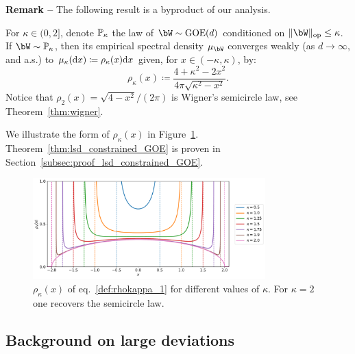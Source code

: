 \myskip
\textbf{Remark --}
The following result is a byproduct of our analysis.
\begin{theorem}\label{thm:lsd_constrained_GOE}
   For $\kappa \in (0,2]$, denote $\mathbb{P}_\kappa$ the law of $\bW \sim \GOE(d)$ conditioned on $\|\bW\|_\op \leq \kappa$. 
    If $\bW \sim \bbP_\kappa$, then its empirical spectral density $\mu_\bW$ converges weakly (as $d \to \infty$, and a.s.) to $\mu_\kappa(\mathrm{d} x) \coloneqq \rho_\kappa(x) \mathrm{d} x$ given, for $x \in (-\kappa, \kappa)$, by:
    \begin{equation}
        \label{def:rhokappa_1}
        \rho_\kappa(x) \coloneqq \frac{4+\kappa^2-2x^2}{4 \pi \sqrt{\kappa^2 - x^2}}. 
    \end{equation}
    Notice that $\rho_{2}(x) = \sqrt{4 - x^2}/(2\pi)$ is Wigner's semicircle law, see Theorem~\ref{thm:wigner}.
\end{theorem}
\noindent
We illustrate the form of $\rho_\kappa(x)$ in Figure~\ref{fig:rho_kappa}.
Theorem~\ref{thm:lsd_constrained_GOE} is proven in Section~\ref{subsec:proof_lsd_constrained_GOE}.
\begin{figure}[!t]
   \centering
\includegraphics[width=0.8\textwidth]{figures/rho_kappa.pdf}
\caption{$\rho_\kappa(x)$ of eq.~\eqref{def:rhokappa_1} for different values of $\kappa$. For $\kappa = 2$ one recovers the semicircle law.\label{fig:rho_kappa}}
\end{figure}

\subsection{Background on large deviations}

